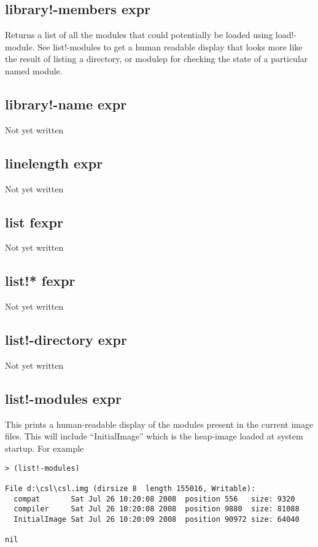 \documentclass[a4paper,11pt]{article}
\begin{document}
\subsection{\ttfamily library!-members expr}
Returns a list of all the modules that could potentially be loaded using
{\ttfamily load!-module}. See {\ttfamily list!-modules} to get a human
readable display that looks more like the result of listing a directory, or
{\ttfamily modulep} for checking the state of a particular named module.

\subsection{\ttfamily library!-name expr}
Not yet written

\subsection{\ttfamily linelength expr}
Not yet written

\subsection{\ttfamily list fexpr}
Not yet written

\subsection{\ttfamily list!* fexpr}
Not yet written

\subsection{\ttfamily list!-directory expr}
Not yet written


\subsection{\ttfamily list!-modules expr}
This prints a human-readable display of the modules present in the current
image files. This will include ``InitialImage'' which is the heap-image
loaded at system startup. For example
\begin{verbatim}
> (list!-modules)

File d:\csl\csl.img (dirsize 8  length 155016, Writable):
  compat       Sat Jul 26 10:20:08 2008  position 556   size: 9320
  compiler     Sat Jul 26 10:20:08 2008  position 9880  size: 81088
  InitialImage Sat Jul 26 10:20:09 2008  position 90972 size: 64040

nil
\end{verbatim}
\end{document}
